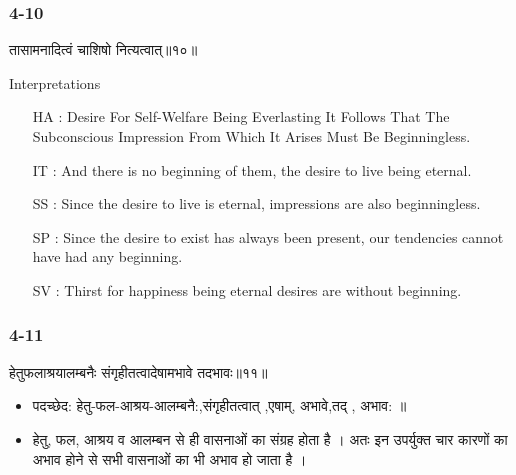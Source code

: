 \begin{frame}[fragile]\frametitle{4-10}
\begin{sanskrit}
तासामनादित्वं चाशिषो नित्यत्वात्॥१०॥
\end{sanskrit}

Interpretations
	\begin{itemize}	
	\item [HA]: Desire For Self-Welfare Being Everlasting It Follows That The Subconscious Impression From Which It Arises Must Be Beginningless.
	\item [IT]: And there is no beginning of them, the desire to live being eternal.
	\item [SS]: Since the desire to live is eternal, impressions are also beginningless.
	\item [SP]: Since the desire to exist has always been present, our tendencies cannot have had any beginning.
	\item [SV]: Thirst for happiness being eternal desires are without beginning. 
	\end{itemize}
\end{frame}

\begin{frame}[fragile]\frametitle{4-11}
\begin{sanskrit}
हेतुफलाश्रयालम्बनैः संगृहीतत्वादेषामभावे तदभावः॥११॥
\end{sanskrit}

\begin{itemize}
\item पदच्छेद:  हेतु-फल-आश्रय-आलम्बनै:,संगृहीतत्वात् ,एषाम्, अभावे,तद् , अभाव: ॥
\item हेतु, फल, आश्रय व आलम्बन से ही वासनाओं का संग्रह होता है । अतः इन उपर्युक्त चार कारणों का अभाव होने से सभी वासनाओं का भी अभाव हो जाता है ।
\end{itemize}
\end{frame}


